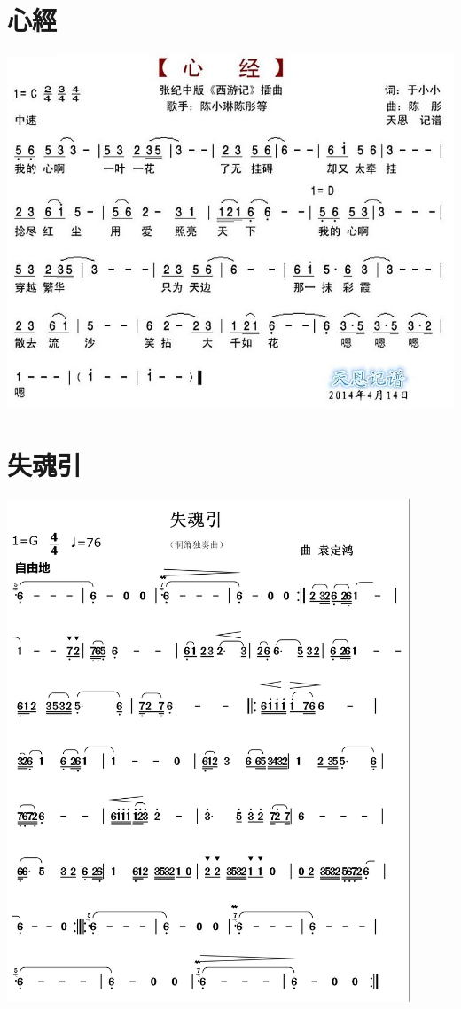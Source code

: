 \documentclass[cn,pad,twocol]{elegantbook}
\begin{document}
\section{心經}
    \includegraphics[width=\textwidth]{dongxiao/20201231-心经} 
\section{失魂引}
    \includegraphics[width=0.9\textwidth]{rpi400/20201226失魂引.png}
\end{document}
